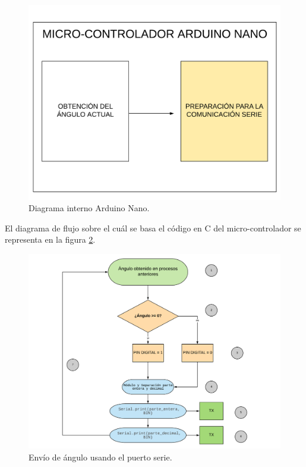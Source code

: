 \begin{figure}[H]
	\center
	\includegraphics[trim = 0mm 0mm 0mm 0mm, clip,scale=0.3]{imagenes/Balancing_robot/coexistencia3.pdf}
	\caption{Diagrama interno Arduino Nano.}
	\label{fig:coexistencia3}
\end{figure}

El diagrama de flujo sobre el cuál se basa el código en C del micro-controlador se representa en la figura \ref{fig:extraccion_angulo}.

\begin{figure}[H]
	\center
	\includegraphics[trim = 0mm 0mm 0mm 0mm, clip,scale=0.4]{imagenes/Balancing_robot/extraccion_angulo.pdf}
	\caption{Envío de ángulo usando el puerto serie.}
	\label{fig:extraccion_angulo}
\end{figure}

